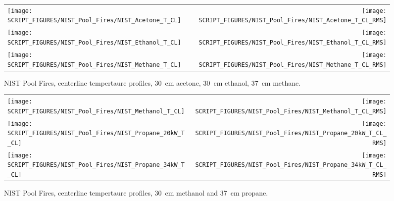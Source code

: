 \newpage

\begin{figure}[p]
\begin{tabular*}{\textwidth}{l@{\extracolsep{\fill}}r}
\texttt{[image: SCRIPT\_FIGURES/NIST\_Pool\_Fires/NIST\_Acetone\_T\_CL]} &
\texttt{[image: SCRIPT\_FIGURES/NIST\_Pool\_Fires/NIST\_Acetone\_T\_CL\_RMS]} \\
\texttt{[image: SCRIPT\_FIGURES/NIST\_Pool\_Fires/NIST\_Ethanol\_T\_CL]} &
\texttt{[image: SCRIPT\_FIGURES/NIST\_Pool\_Fires/NIST\_Ethanol\_T\_CL\_RMS]} \\
\texttt{[image: SCRIPT\_FIGURES/NIST\_Pool\_Fires/NIST\_Methane\_T\_CL]} &
\texttt{[image: SCRIPT\_FIGURES/NIST\_Pool\_Fires/NIST\_Methane\_T\_CL\_RMS]}
\end{tabular*}
\caption[NIST Pool Fires, centerline temperature, acetone, ethanol, methane]
{NIST Pool Fires, centerline tempertaure profiles, 30~cm acetone, 30~cm ethanol, 37~cm methane.}
\label{NIST_Pool_Fires_Temperature_1}
\end{figure}

\begin{figure}[p]
\begin{tabular*}{\textwidth}{l@{\extracolsep{\fill}}r}
\texttt{[image: SCRIPT\_FIGURES/NIST\_Pool\_Fires/NIST\_Methanol\_T\_CL]} &
\texttt{[image: SCRIPT\_FIGURES/NIST\_Pool\_Fires/NIST\_Methanol\_T\_CL\_RMS]} \\
\texttt{[image: SCRIPT\_FIGURES/NIST\_Pool\_Fires/NIST\_Propane\_20kW\_T\_CL]} &
\texttt{[image: SCRIPT\_FIGURES/NIST\_Pool\_Fires/NIST\_Propane\_20kW\_T\_CL\_RMS]} \\
\texttt{[image: SCRIPT\_FIGURES/NIST\_Pool\_Fires/NIST\_Propane\_34kW\_T\_CL]} &
\texttt{[image: SCRIPT\_FIGURES/NIST\_Pool\_Fires/NIST\_Propane\_34kW\_T\_CL\_RMS]}
\end{tabular*}
\caption[NIST Pool Fires, centerline temperature, methanol and propane]
{NIST Pool Fires, centerline tempertaure profiles, 30~cm methanol and 37~cm propane.}
\label{NIST_Pool_Fires_Temperature_2}
\end{figure}

